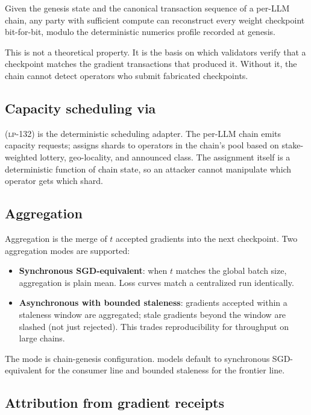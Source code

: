\begin{proposition}[Reproducibility]
Given the genesis state and the canonical transaction sequence of a per-LLM chain, any party with sufficient compute can reconstruct every weight checkpoint bit-for-bit, modulo the deterministic numerics profile recorded at genesis.
\end{proposition}

This is not a theoretical property. It is the basis on which validators verify that a checkpoint matches the gradient transactions that produced it. Without it, the chain cannot detect operators who submit fabricated checkpoints.

\subsection{Capacity scheduling via \Quasar{}\GPU{}}

\Quasar{}\GPU{} (\textsc{lp-132}) is the deterministic \GPU{} scheduling adapter. The per-LLM chain emits capacity requests; \Quasar{}\GPU{} assigns shards to operators in the chain's pool based on stake-weighted lottery, geo-locality, and announced \GPU{} class. The assignment itself is a deterministic function of chain state, so an attacker cannot manipulate which operator gets which shard.

\subsection{Aggregation}

Aggregation is the merge of $t$ accepted gradients into the next checkpoint. Two aggregation modes are supported:

\begin{itemize}[nosep]
\item \textbf{Synchronous SGD-equivalent}: when $t$ matches the global batch size, aggregation is plain mean. Loss curves match a centralized run identically.
\item \textbf{Asynchronous with bounded staleness}: gradients accepted within a staleness window are aggregated; stale gradients beyond the window are slashed (not just rejected). This trades reproducibility for throughput on large chains.
\end{itemize}

The mode is chain-genesis configuration. \Zen{} models default to synchronous SGD-equivalent for the consumer line and bounded staleness for the frontier line.

\subsection{Attribution from gradient receipts}

